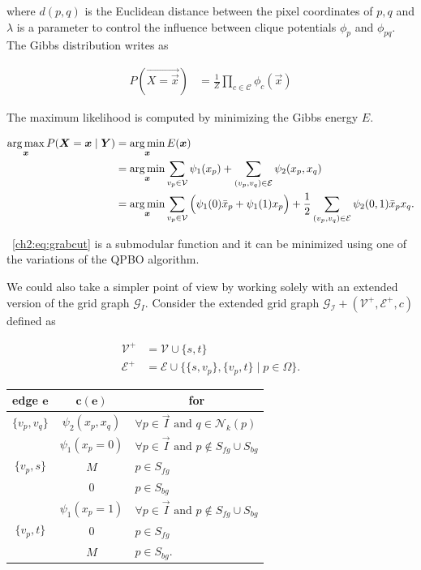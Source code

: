 where $d(p,q)$ is the Euclidean distance between the pixel coordinates of $p,q$ and $\lambda$ is a parameter to control the influence between clique potentials $\phi_p$ and $\phi_{pq}$. The Gibbs distribution writes as

\begin{align*}
	P(\vec{X=\vec{x}}) &= \frac{1}{Z} \prod_{c \in \mathcal{C}}{\phi_c(\vec{x})}
\end{align*}

The maximum likelihood is computed by minimizing the Gibbs energy $E$.

\begin{align}
	\operatorname*{arg\,max}_{\bm{x}} P(\bm{X}=\bm{x}\;|\;\bm{Y}) &= \operatorname*{arg\,min}_{\bm{x}} E(\bm{x}) \nonumber \\	
	&= \operatorname*{arg\,min}_{\bm{x}} \sum_{v_p \in \mathcal{V}}\psi_1(x_p) + \sum_{ (v_p,v_q) \in \mathcal{E} }\psi_2(x_p,x_q) \nonumber \\
	&= \operatorname*{arg\,min}_{\bm{x}} \sum_{v_p \in \mathcal{V}}{ \Big( \psi_1(0)\bar{x}_p + \psi_1(1)x_p \Big)} + \frac{1}{2}\sum_{ (v_p,v_q) \in \mathcal{E} }{\psi_{2}(0,1)\bar{x}_px_q}.
	\label{ch2:eq:grabcut}
\end{align}

~\cref{ch2:eq:grabcut} is a submodular function and it can be minimized using one of the variations of the QPBO algorithm. 

We could also take a simpler point of view by working solely with an extended version of the grid graph $\mathcal{G}_I$. Consider the extended grid graph $\mathcal{G_I+}(\mathcal{V}^+,\mathcal{E}^+,c)$ defined as


\begin{align*}
	\mathcal{V}^+ &= \mathcal{V} \cup \{s,t\}\\
	\mathcal{E}^+ &= \mathcal{E} \cup \big\{ \{s,v_p\}, \{v_p,t\} \; | \; p \in \Omega \big\}.
\end{align*}

\begin{table}[h]
\center
\begin{tabular}{c|c|l}	
	\multicolumn{1}{c|}{\textbf{edge} $\mathbf{e}$} & \multicolumn{1}{c|}{$\mathbf{c(e)}$} & \multicolumn{1}{c}{\textbf{for}}\\
	\hline
	$\{v_p,v_q\}$ & $\psi_{2}(x_p,x_q)$ & $\forall p \in \vec{I} \text{ and } q \in \mathcal{N}_k(p)$\\
	\hline
	\multirow{3}{*}{ $\{v_p,s\}$ } & $\psi_1(x_p=0)$ & $\forall p \in \vec{I} \text{ and } p \notin S_{fg} \cup S_{bg}$\\
	& $M$ & $p \in S_{fg}$ \\
	& $0$ & $p \in S_{bg}$\\
	\hline
	\multirow{3}{*}{ $\{v_p,t\}$ } & $\psi_1(x_p=1)$ & $\forall p \in \vec{I} \text{ and } p \notin S_{fg} \cup S_{bg}$\\
	& $0$ & $p \in S_{fg}$ \\
	& $M$ & $p \in S_{bg}$.
\end{tabular}
\end{table}

